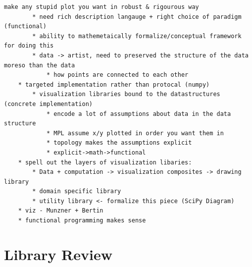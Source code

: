 \documentclass[letterpaper,onecolumn,titlepage]{Ythesis}
\begin{document}
\begin{verbatim}
make any stupid plot you want in robust & rigourous way
        * need rich description langauge + right choice of paradigm (functional) 
        * ability to mathemetaically formalize/conceptual framework for doing this
        * data -> artist, need to preserved the structure of the data moreso than the data 
            * how points are connected to each other
    * targeted implementation rather than protocal (numpy)
        * visualization libraries bound to the datastructures (concrete implementation)
            * encode a lot of assumptions about data in the data structure
            * MPL assume x/y plotted in order you want them in 
            * topology makes the assumptions explicit
            * explicit->math->functional  
    * spell out the layers of visualization libaries:
        * Data + computation -> visualization composites -> drawing library
        * domain specific library
        * utility library <- formalize this piece (SciPy Diagram)
    * viz - Munzner + Bertin
    * functional programming makes sense 
\end{verbatim}


\section{Library Review}
\end{document}
